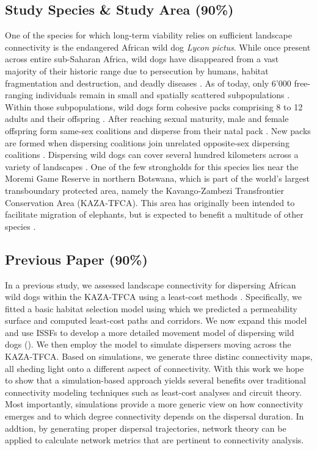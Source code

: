 \documentclass[abstract=on,10pt,a4paper,bibliography=totocnumbered]{article}
\begin{document}
\subsection{Study Species \& Study Area (90\%)}
One of the species for which long-term viability relies on sufficient landscape
connectivity is the endangered African wild dog \textit{Lycon pictus}. While
once present across entire sub-Saharan Africa, wild dogs have disappeared from a
vast majority of their historic range due to persecution by humans, habitat
fragmentation and destruction, and deadly diseases \citep{Woodroffe.2012}. As of
today, only 6'000 free-ranging individuals remain in small and spatially
scattered subpopulations \citep{Woodroffe.2012}. Within those subpopulations,
wild dogs form cohesive packs comprising 8 to 12 adults and their offspring
\cite{McNutt.1995}. After reaching sexual maturity, male and female offspring
form same-sex coalitions and disperse from their natal pack \citep{McNutt.1996,
Behr.2020}. New packs are formed when dispersing coalitions join unrelated
opposite-sex dispersing coalitions \citep{McNutt.1996}. Dispersing wild dogs can
cover several hundred kilometers across a variety of landscapes
\citep{DaviesMostert.2012, Masenga.2016, Cozzi.2020, Hofmann.2021}. One of the
few strongholds for this species lies near the Moremi Game Reserve in northern
Botswana, which is part of the world's largest transboundary protected area,
namely the Kavango-Zambezi Transfrontier Conservation Area (KAZA-TFCA). This
area has originally been intended to facilitate migration of elephants, but is
expected to benefit a multitude of other species \citep{Elliot.2014,
Brennan.2020, Hofmann.2021}.

\subsection{Previous Paper (90\%)}
In a previous study, we assessed landscape connectivity for dispersing African
wild dogs within the KAZA-TFCA using a least-cost methods \citep{Hofmann.2021}.
Specifically, we fitted a basic habitat selection model using which we predicted
a permeability surface and computed least-cost paths and corridors. We now
expand this model and use ISSFs to develop a more detailed movement model of
dispersing wild dogs (). We then employ the model to
simulate dispersers moving across the KAZA-TFCA. Based on simulations, we
generate three distinc connectivity maps, all sheding light onto a different
aspect of connectivity. With this work we hope to show that a simulation-based
approach yields several benefits over traditional connectivity modeling
techniques such as least-cost analyses and circuit theory. Most importantly,
simulations provide a more generic view on how connectivity emerges and to which
degree connectivity depends on the dispersal duration. In addtion, by generating
proper dispersal trajectories, network theory can be applied to calculate
network metrics that are pertinent to connectivity analysis.
\end{document}
